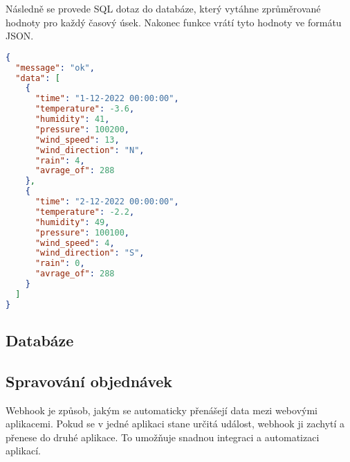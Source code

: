 Následně se provede SQL dotaz do databáze, který vytáhne zprůměrované hodnoty pro každý časový úsek. Nakonec funkce vrátí tyto hodnoty ve formátu JSON.
\begin{lstlisting}[language=json,firstnumber=1, caption=Příklad požadavku /stats/{gps}]
{
  "message": "ok",
  "data": [
    {
      "time": "1-12-2022 00:00:00",
      "temperature": -3.6,
      "humidity": 41,
      "pressure": 100200,
      "wind_speed": 13,
      "wind_direction": "N",
      "rain": 4,
      "avrage_of": 288
    },
    {
      "time": "2-12-2022 00:00:00",
      "temperature": -2.2,
      "humidity": 49,
      "pressure": 100100,
      "wind_speed": 4,
      "wind_direction": "S",
      "rain": 0,
      "avrage_of": 288
    }
  ]
}
\end{lstlisting}
\subsection{Databáze}

\subsection{Spravování objednávek}
Webhook je způsob, jakým se automaticky přenášejí data mezi webovými aplikacemi.
Pokud se v jedné aplikaci stane určitá událost, webhook ji zachytí a přenese do druhé aplikace. To umožňuje snadnou integraci a automatizaci aplikací.
